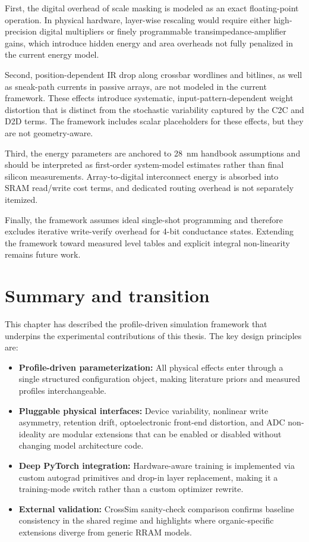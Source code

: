 First, the digital overhead of scale masking is modeled as an exact floating-point operation. In physical hardware, layer-wise rescaling would require either high-precision digital multipliers or finely programmable transimpedance-amplifier gains, which introduce hidden energy and area overheads not fully penalized in the current energy model.

Second, position-dependent IR drop along crossbar wordlines and bitlines, as well as sneak-path currents in passive arrays, are not modeled in the current framework. These effects introduce systematic, input-pattern-dependent weight distortion that is distinct from the stochastic variability captured by the C2C and D2D terms. The framework includes scalar placeholders for these effects, but they are not geometry-aware.

Third, the energy parameters are anchored to 28~nm handbook assumptions and should be interpreted as first-order system-model estimates rather than final silicon measurements. Array-to-digital interconnect energy is absorbed into SRAM read/write cost terms, and dedicated routing overhead is not separately itemized.

Finally, the framework assumes ideal single-shot programming and therefore excludes iterative write-verify overhead for 4-bit conductance states. Extending the framework toward measured level tables and explicit integral non-linearity remains future work.

\section{Summary and transition}

This chapter has described the profile-driven simulation framework that underpins the experimental contributions of this thesis. The key design principles are:
\begin{itemize}
\item \textbf{Profile-driven parameterization:} All physical effects enter through a single structured configuration object, making literature priors and measured profiles interchangeable.
\item \textbf{Pluggable physical interfaces:} Device variability, nonlinear write asymmetry, retention drift, optoelectronic front-end distortion, and ADC non-ideality are modular extensions that can be enabled or disabled without changing model architecture code.
\item \textbf{Deep PyTorch integration:} Hardware-aware training is implemented via custom autograd primitives and drop-in layer replacement, making it a training-mode switch rather than a custom optimizer rewrite.
\item \textbf{External validation:} CrossSim sanity-check comparison confirms baseline consistency in the shared regime and highlights where organic-specific extensions diverge from generic RRAM models.
\end{itemize}

